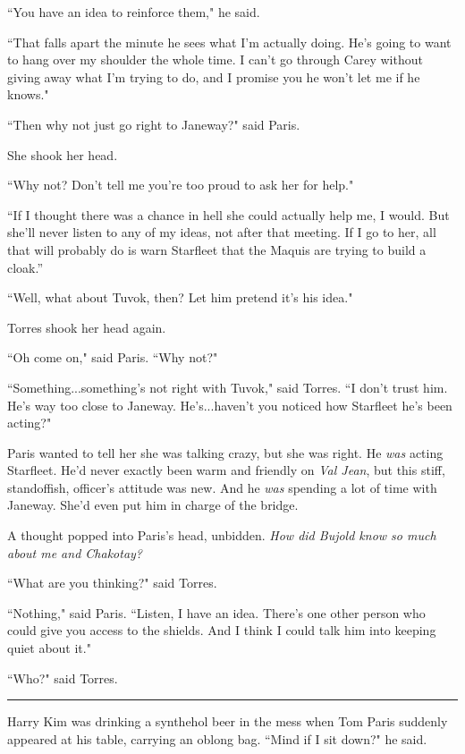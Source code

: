 \documentclass[twoside,letterpaper,12pt]{memoir}
\begin{document}
``You have an idea to reinforce them," he said. 

``That falls apart the minute he sees what I'm actually doing. He's going to want to hang over my shoulder the whole time. I can't go through Carey without giving away what I'm trying to do, and I promise you he won't let me if he knows." 

``Then why not just go right to Janeway?" said Paris. 

She shook her head. 

``Why not? Don't tell me you're too proud to ask her for help." 

``If I thought there was a chance in hell she could actually help me, I would. But she’ll never listen to any of my ideas, not after that meeting. If I go to her, all that will probably do is warn Starfleet that the Maquis are trying to build a cloak.” 

``Well, what about Tuvok, then? Let him pretend it's his idea." 

Torres shook her head again. 

``Oh come on," said Paris. ``Why not?" 

``Something...something's not right with Tuvok," said Torres. ``I don't trust him. He's way too close to Janeway. He's...haven't you noticed how Starfleet he's been acting?" 

Paris wanted to tell her she was talking crazy, but she was right. He \textit{was} acting Starfleet. He'd never exactly been warm and friendly on \textit{Val Jean}, but this stiff, standoffish, officer's attitude was new. And he \textit{was} spending a lot of time with Janeway. She'd even put him in charge of the bridge.

A thought popped into Paris's head, unbidden. \textit{How did Bujold know so much about me and Chakotay?} 

``What are you thinking?" said Torres. 

``Nothing," said Paris. ``Listen, I have an idea. There's one other person who could give you access to the shields. And I think I could talk him into keeping quiet about it." 

``Who?" said Torres. 

\begin{center}\rule{3cm}{0.4 pt}\end{center} 

Harry Kim was drinking a synthehol beer in the mess when Tom Paris suddenly appeared at his table, carrying an oblong bag. ``Mind if I sit down?" he said. 
\end{document}
